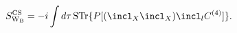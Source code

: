 \begin{equation}
\label{IIBwavesCS}
S^{\rm CS}_{\rm W_B}=-i\int d\tau\, {\rm STr} \{P[(\incl_X\incl_X)\incl_l C^{(4)}]\}.
\end{equation}

